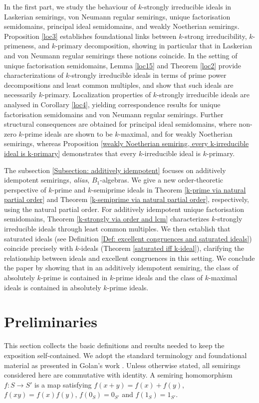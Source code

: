 \documentclass[11pt,english]{amsart}
\theoremstyle{definition}
\numberwithin{equation}{section}
\begin{document}
In the first part, we study the behaviour of $k$-strongly irreducible ideals in Laskerian semirings, von Neumann regular semirings, unique factorisation semidomains, principal ideal semidomains, and weakly Noetherian semirings. Proposition \ref{loc3} establishes foundational links between $k$-strong irreducibility, $k$-primeness, and $k$-primary decomposition, showing in particular that in Laskerian and von Neumann regular semirings these notions coincide. In the setting of unique factorisation semidomains, Lemma \ref{loc15} and Theorem \ref{loc2} provide characterizations of $k$-strongly irreducible ideals in terms of prime power decompositions and least common multiples, and show that such ideals are necessarily $k$-primary. Localization properties of $k$-strongly irreducible ideals are analysed in Corollary \ref{loc4}, yielding correspondence results for unique factorisation semidomains and von Neumann regular semirings. Further structural consequences are obtained for principal ideal semidomains, where non-zero $k$-prime ideals are shown to be $k$-maximal, and for weakly Noetherian semirings, whereas Proposition \ref{weakly Noetherian semiring, every k-irreducible ideal is k-primary} demonstrates that every $k$-irreducible ideal is $k$-primary.

The subsection \ref{Subsection: additively idempotent} focuses on additively idempotent semirings, \textit{alias}, $B_1$-algebras. We give a new order-theoretic perspective of $k$-prime and $k$-semiprime ideals in Theorem \ref{k-prime via natural partial order} and Theorem \ref{k-semiprime via natural partial order}, respectively, using the natural partial order. For additively idempotent unique factorisation semidomains, Theorem \ref{k-strongly via order and lcm} characterizes $k$-strongly irreducible ideals through least common multiples. We then establish that saturated ideals (see Definition \ref{Def: excellent congruences and saturated ideals}) coincide precisely with $k$-ideals (Theorem \ref{saturated iff k-ideal}), clarifying the relationship between ideals and excellent congruences in this setting. We conclude the paper by showing that in an additively idempotent semiring, the class of absolutely $k$-prime is contained in $k$-prime ideals and the class of $k$-maximal ideals is contained in absolutely $k$-prime ideals. 

\smallskip
\section{Preliminaries}\label{prim} 
This section collects the basic definitions and results needed to keep the exposition self-contained. We adopt the standard terminology and foundational material as presented in Golan’s work \cite{Golan}. 
Unless otherwise stated, all semirings considered here are commutative with identity. A semiring homomorphism $f\colon S\rightarrow S'$ is a map satisfying $f(x+y)=f(x)+f(y)$, $f(xy)=f(x)f(y)$, $f(0_S)=0_{S'}$ and $f(1_S)=1_{S'}$. 
\end{document}
